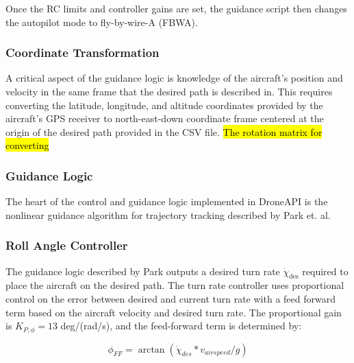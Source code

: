 \documentclass{aiaa}
\begin{document}

Once the RC limits and controller gains are set, the guidance script then changes the autopilot mode to fly-by-wire-A (FBWA).

\subsubsection{Coordinate Transformation}

A critical aspect of the guidance logic is knowledge of the aircraft's position and velocity in the same frame that the desired path is described in. This requires converting the latitude, longitude, and altitude coordinates provided by the aircraft's GPS receiver to north-east-down coordinate frame centered at the origin of the desired path provided in the CSV file. \hl{ The rotation matrix for converting}


\subsubsection{Guidance Logic}

The heart of the control and guidance logic implemented in DroneAPI is the nonlinear guidance algorithm for trajectory tracking described by Park et. al. 

\subsubsection{Roll Angle Controller}

The guidance logic described by Park outputs a desired turn rate $\dot{\chi}_{\text{des}}$ required to place the aircraft on the desired path. The turn rate controller uses proportional control on the error between desired and current turn rate with a feed forward term based on the aircraft velocity and desired turn rate. The proportional gain is $K_{P,\phi} = 13$  deg/(rad/s), and the feed-forward term is determined by:


\begin{equation}
	\phi_{FF} = \arctan{(\dot{\chi}_{des}*v_{airspeed}/g)}
\end{equation}
\end{document}
